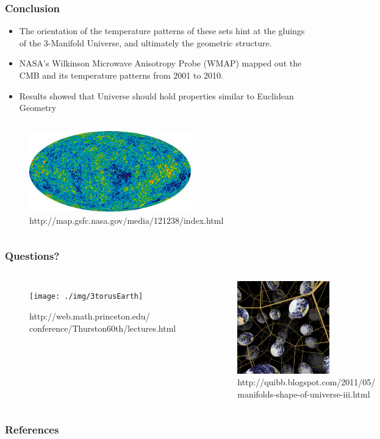 \documentclass[13pt]{beamer}
\begin{document}
\begin{frame}
\frametitle{Conclusion}
  \begin{itemize}
    \item The orientation of the temperature patterns of these sets hint at the gluings of the 3-Manifold Universe, and ultimately the geometric structure.
    \item NASA's Wilkinson Microwave Anisotropy Probe (WMAP) mapped out the CMB and its temperature patterns from 2001 to 2010.
    \item Results showed that Universe should hold properties similar to Euclidean Geometry
  \end{itemize}

  \begin{columns}[c] %
       \centering
        \begin{figure}
          \includegraphics[height=3.5cm]{./img/cmbsky} 
          \caption{http://map.gsfc.nasa.gov/media/121238/index.html}
        \end{figure}
    \end{columns}
\end{frame}

\begin{frame}
\frametitle{Questions?}
   \begin{columns}[c] %
     \centering
      \begin{figure}
        \texttt{[image: ./img/3torusEarth]} %
        \caption{http://web.math.princeton.edu/\\conference/Thurston60th/lectures.html}
      \end{figure}
     \centering
      \begin{figure}
        \includegraphics[height=4cm]{./img/poincarespaceEarth} %
        \caption{http://quibb.blogspot.com/2011/05/\\manifolds-shape-of-universe-iii.html}
      \end{figure}
  \end{columns}
\end{frame}

 \begin{frame}[shrink=30]
  \frametitle{References}
  \nocite{*} 
  
\end{frame}
\end{document}
